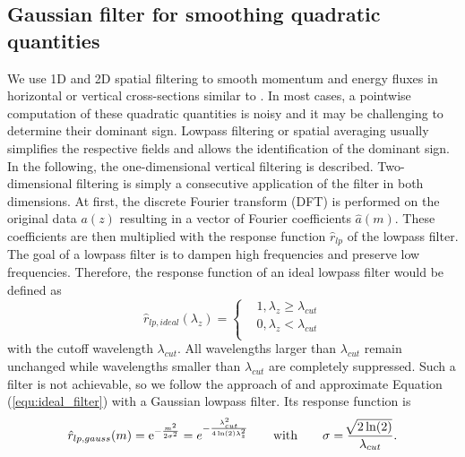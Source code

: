 \subsection*{Gaussian filter for smoothing quadratic quantities}
We use 1D and 2D spatial filtering to smooth momentum and energy fluxes in horizontal or vertical cross-sections similar to \textcite[]{kruse_gravity_2015}. In most cases, a pointwise computation of these quadratic quantities is noisy and it may be challenging to determine their dominant sign. Lowpass filtering or spatial averaging usually simplifies the respective fields and allows the identification of the dominant sign.\\
In the following, the one-dimensional vertical filtering is described. Two-dimensional filtering is simply a consecutive application of the filter in both dimensions. At first, the discrete Fourier transform (DFT) is performed on the original data $a(z)$ resulting in a vector of Fourier coefficients $\hat{a}(m)$. These coefficients are then multiplied with the response function $\hat{r}_{lp}$ of the lowpass filter.\\
The goal of a lowpass filter is to dampen high frequencies and preserve low frequencies. Therefore, the response function of an ideal lowpass filter would be defined as 
\begin{equation}
    \hat{r}_{lp,ideal}(\lambda_z) = 
    \begin{cases}
        & 1, \lambda_{z} \geq \lambda_{cut} \\
        & 0, \lambda_{z} < \lambda_{cut} \\
      \end{cases}
    \label{equ:ideal_filter}
\end{equation}
with the cutoff wavelength $\lambda_{cut}$. All wavelengths larger than $\lambda_{cut}$ remain unchanged while wavelengths smaller than $\lambda_{cut}$ are completely suppressed. Such a filter is not achievable, so we follow the approach of \textcite[]{kruse_gravity_2015} and approximate Equation (\ref{equ:ideal_filter}) with a Gaussian lowpass filter. Its response function is
\begin{equation}
    \hat{r}_{lp,gauss}(m) = {\rm e}^{-\frac{m^2}{2 \sigma^2}} = e^{-\frac{\lambda_{cut}^2}{4 \ln(2) \lambda_z^2}} \qquad \mathrm{with} \qquad \sigma=\frac{\sqrt[]{2 \ln(2)}}{\lambda_{cut}}.
    \label{equ:gauss_filter}
\end{equation}
